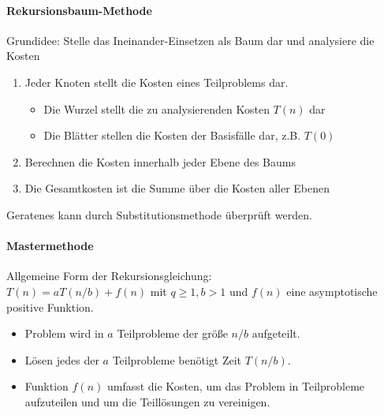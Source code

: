	\paragraph{Rekursionsbaum-Methode}
	Grundidee: Stelle das Ineinander-Einsetzen als Baum dar und analysiere die Kosten
	\begin{enumerate}
		\item Jeder Knoten stellt die Kosten eines Teilproblems dar.
		\begin{itemize}
			\item Die Wurzel stellt die zu analysierenden Kosten $T(n)$ dar
			\item Die Blätter stellen die Kosten der Basisfälle dar, z.B. $T(0)$
		\end{itemize}
		\item Berechnen die Kosten innerhalb jeder Ebene des Baums
		\item Die Gesamtkosten ist die Summe über die Kosten aller Ebenen
	\end{enumerate}
	Geratenes kann durch Substitutionsmethode überprüft werden.


	\paragraph{Mastermethode}
	Allgemeine Form der Rekursionsgleichung: \\
	\noindent $T(n) = aT(n/b) + f(n)$ mit $q \geq 1, b > 1$ und $f(n)$ eine asymptotische positive Funktion.

	\begin{itemize}
		\item Problem wird in $a$ Teilprobleme der grö\ss e $n/b$ aufgeteilt.
		\item Lösen jedes der $a$ Teilprobleme benötigt Zeit $T(n/b)$.
		\item Funktion $f(n)$ umfasst die Kosten, um das Problem in Teilprobleme aufzuteilen
			und um die Teillösungen zu vereinigen.
	\end{itemize}

